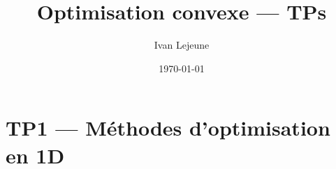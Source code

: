 \documentclass[french,a4paper,10pt]{article}
\title{\color{astral} \sffamily \bfseries Optimisation convexe --- TPs}
\author{Ivan Lejeune}
\date{\today}
\begin{document}
    \maketitle
    \tableofcontents
    
    \newpage
    \section*{TP1 --- Méthodes d'optimisation en 1D}\label{sec:TD1}
    \setcounter{section}{1}
    \setcounter{tdcounter}{0}
    
\end{document}
